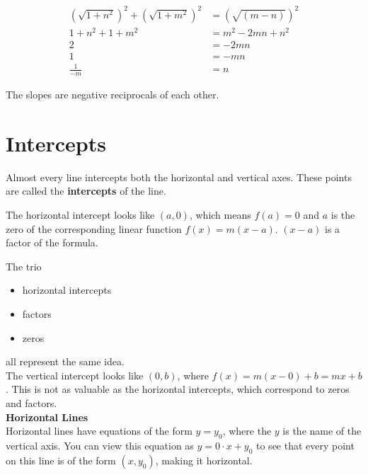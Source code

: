 \documentclass{ximera}
\begin{document}
\begin{align*}
\left(\sqrt{1 + n^2}\right)^2 + \left(\sqrt{1 + m^2}\right)^2 & = \left(\sqrt{(m-n)}\right)^2 \\
1 + n^2 + 1 + m^2 & = m^2 - 2 m n + n^2  \\
2 & = -2 m n \\
1 & = -m n \\
\frac{1}{-m} & = n
\end{align*}

The slopes are negative reciprocals of each other.



















\section{Intercepts}


Almost every line intercepts both the horizontal and vertical axes.  These points are called the \textbf{intercepts} of the line.  

The horizontal intercept looks like $(a, 0)$, which means $f(a)=0$ and $a$ is the zero of the corresponding linear function $f(x) = m (x-a)$.   $(x - a)$ is a factor of the formula.



The trio 

\begin{itemize}
\item horizontal intercepts
\item factors
\item zeros
\end{itemize}

all represent the same idea. \\



The vertical intercept looks like $(0, b)$, where $f(x) = m(x-0)+b = m x + b$.  This is not as valuable as the horizontal intercepts, which correspond to zeros and factors. \\










\textbf{Horizontal Lines} \\
Horizontal lines have equations of the form $y = y_0$, where the $y$ is the name of the vertical axis. You can view this equation as $y = 0 \cdot x + y_0$ to see that every point on this line is of the form $(x, y_0)$, making it horizontal.
\end{document}
